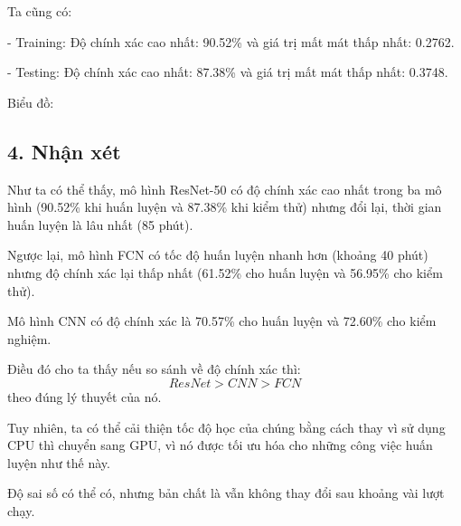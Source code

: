 \documentclass[../main.tex]{subfiles}
\begin{document}
Ta cũng có: 

- Training:
Độ chính xác cao nhất: 90.52\% và giá trị mất mát thấp nhất: 0.2762.

- Testing:
Độ chính xác cao nhất: 87.38\% và giá trị mất mát thấp nhất: 0.3748.

Biểu đồ:


\subsection*{4. Nhận xét}

Như ta có thể thấy, mô hình ResNet-50 có độ chính xác cao nhất trong ba mô hình (90.52\% khi huấn luyện và 87.38\% khi kiểm thử) nhưng đổi lại, thời gian huấn luyện là lâu nhất (85 phút).

Ngược lại, mô hình FCN có tốc độ huấn luyện nhanh hơn (khoảng 40 phút) nhưng độ chính xác lại thấp nhất (61.52\% cho huấn luyện và 56.95\% cho kiểm thử).

Mô hình CNN có độ chính xác là 70.57\% cho huấn luyện và 72.60\% cho kiểm nghiệm.

Điều đó cho ta thấy nếu so sánh về độ chính xác thì: \[ResNet > CNN > FCN\] theo đúng lý thuyết của nó.

Tuy nhiên, ta có thể cải thiện tốc độ học của chúng bằng cách thay vì sử dụng CPU thì chuyển sang GPU, vì nó được tối ưu hóa cho những công việc huấn luyện như thế này.

Độ sai số có thể có, nhưng bản chất là vẫn không thay đổi sau khoảng vài lượt chạy.
\end{document}
